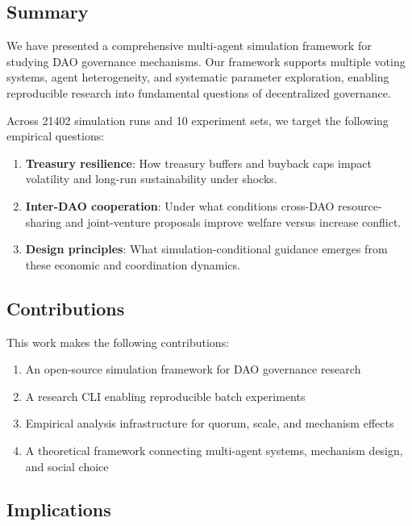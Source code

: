 
\subsection{Summary}

We have presented a comprehensive multi-agent simulation framework for studying DAO governance mechanisms. Our framework supports multiple voting systems, agent heterogeneity, and systematic parameter exploration, enabling reproducible research into fundamental questions of decentralized governance.

Across 21402 simulation runs and 10 experiment sets, we target the following empirical questions:

\begin{enumerate}
    \item \textbf{Treasury resilience}: How treasury buffers and buyback caps impact volatility and long-run sustainability under shocks.

    \item \textbf{Inter-DAO cooperation}: Under what conditions cross-DAO resource-sharing and joint-venture proposals improve welfare versus increase conflict.

    \item \textbf{Design principles}: What simulation-conditional guidance emerges from these economic and coordination dynamics.
\end{enumerate}

\subsection{Contributions}

This work makes the following contributions:

\begin{enumerate}
    \item An open-source simulation framework for DAO governance research
    \item A research CLI enabling reproducible batch experiments
    \item Empirical analysis infrastructure for quorum, scale, and mechanism effects
    \item A theoretical framework connecting multi-agent systems, mechanism design, and social choice
\end{enumerate}

\subsection{Implications}

